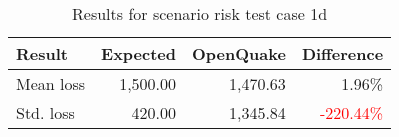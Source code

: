 \begin{table}[htbp]

\centering
\begin{tabular}{ l r r r }

\hline
\rowcolor{anti-flashwhite}
\bf{Result} & \bf{Expected} & \bf{OpenQuake} & \bf{Difference}\\
\hline
Mean loss & 1,500.00 & 1,470.63 & 1.96\% \\
Std. loss & 420.00 & 1,345.84 & \textcolor{red}{-220.44\%} \\
\hline
\end{tabular}

\caption{Results for scenario risk test case 1d}
\label{tab:result-sr-1d}
\end{table}